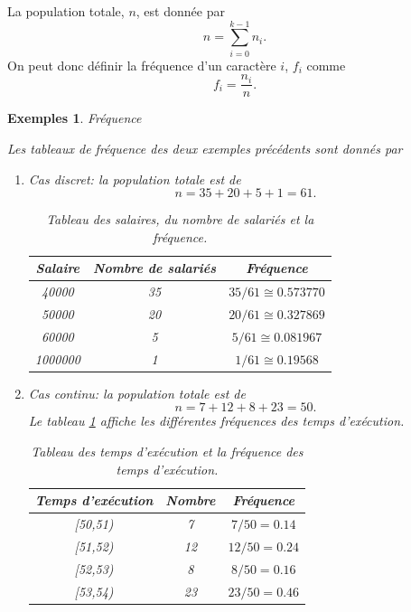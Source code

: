 \documentclass[a4paper,12pt]{book}
\newtheorem*{exemples}{Exemples}
\begin{document}
La population totale, $n$, est donnée par
\begin{equation}
 n=\sum_{i=0}^{k-1}n_i.
\end{equation}
On peut donc définir la fréquence d'un caractère $i$, $f_i$ comme
\begin{equation}
 f_i=\frac{n_i}{n}.
\end{equation}
\begin{exemples}{Fréquence}

Les tableaux de fréquence des deux exemples précédents sont donnés par
 \begin{enumerate}
  \item Cas discret: la population totale est de 
  \begin{equation}
   n=35+20+5+1=61.
  \end{equation}
  \begin{table}[htp]
  \begin{center}
  \begin{tabular}{|c|c|c|}
  \hline
  Salaire & Nombre de salariés & Fréquence\\
  \hline\hline
  40000 & 35 & $35/61\cong0.573770$\\
  \hline
  50000 & 20 & $20/61\cong0.327869$\\
  \hline
  60000 & 5 & $5/61\cong0.081967$ \\
  \hline
  1000000 & 1 & $1/61\cong0.19568$ \\
  \hline
  \end{tabular}
  \end{center}
  \caption{Tableau des salaires, du nombre de salariés et la fréquence.}
  \end{table}

  \item Cas continu: la population totale est de 
  \begin{equation}
   n=7+12+8+23=50.
  \end{equation}
  Le tableau \ref{table_exec_freq} affiche les différentes fréquences des temps d'exécution.
  \begin{table}[htp]
\begin{center}
\begin{tabular}{|c|c|c|}
\hline
 Temps d'exécution & Nombre & Fréquence \\
 \hline\hline
 [50,51) & 7 & $7/50=0.14$\\
 \hline
 [51,52) & 12 & $12/50=0.24$ \\
 \hline
 [52,53) & 8 & $8/50=0.16$ \\
 \hline
 [53,54) & 23 & $23/50=0.46$ \\
 \hline
\end{tabular}
\end{center}
\caption{Tableau des temps d'exécution et la fréquence des temps d'exécution.}\label{table_exec_freq}
\end{table}

 \end{enumerate}
\end{exemples}
\end{document}

